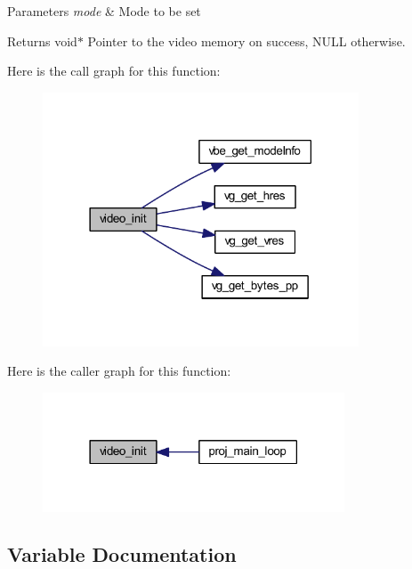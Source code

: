 \begin{DoxyParams}{Parameters}
{\em mode} & Mode to be set \\
\hline
\end{DoxyParams}
\begin{DoxyReturn}{Returns}
void$\ast$ Pointer to the video memory on success, N\+U\+LL otherwise. 
\end{DoxyReturn}
Here is the call graph for this function\+:\nopagebreak
\begin{figure}[H]
\begin{center}
\leavevmode
\includegraphics[width=266pt]{group__video_gad5c198bac564055e1866fd5ac6152308_cgraph}
\end{center}
\end{figure}
Here is the caller graph for this function\+:\nopagebreak
\begin{figure}[H]
\begin{center}
\leavevmode
\includegraphics[width=254pt]{group__video_gad5c198bac564055e1866fd5ac6152308_icgraph}
\end{center}
\end{figure}


\subsection{Variable Documentation}
\mbox{\label{group__video_gaf8420cf3aa35448f046467969f1f9775}} 
